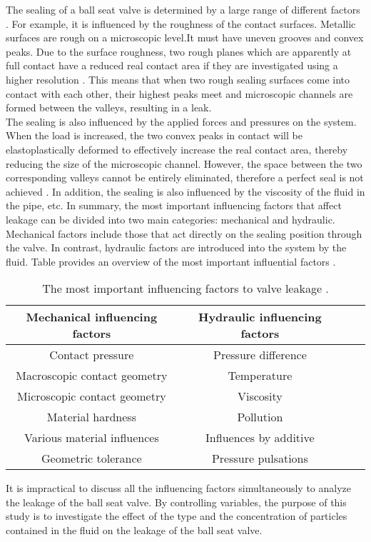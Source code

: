 The sealing of a ball seat valve is determined by a large range of different factors \cite{fischer2021influence}.
For example, it is influenced by the roughness of the contact surfaces. Metallic surfaces are rough 
on a microscopic level.It must have uneven grooves and convex peaks. Due to the surface roughness, two rough 
planes which are apparently at full contact have a reduced real contact area if they 
are investigated using a higher resolution \cite{fischer2021geometry}. This means that when two 
rough sealing surfaces come into contact with each other,
 their highest peaks meet and microscopic channels are formed between the valleys, resulting in a leak.\\

 The sealing is also influenced by the applied forces and pressures on the system. When the load is increased,
  the two convex peaks in contact will be elastoplastically deformed to effectively increase the real contact area, 
  thereby reducing the size of the microscopic channel. However, the space between 
 the two corresponding valleys cannot be entirely eliminated, therefore a perfect seal is not achieved \cite{Sealing2}.
 In addition, the sealing is also influenced by the viscosity of the fluid in the pipe, etc. 
 In summary, the most important influencing factors that affect leakage can be divided into two main 
 categories: mechanical and hydraulic. Mechanical factors include those that act directly on the sealing 
 position through the valve. In contrast, hydraulic factors are introduced into 
 the system by the fluid. Table  provides an overview of the most 
 important influential factors \cite{PhD-M.S}.


    \begin{table}[h!]
        \centering
        \begin{tabular}{|c| c |c |c|} 
         \hline
         Mechanical influencing factors & Hydraulic influencing factors  \\ [0.5ex] 
         \hline
         Contact pressure  & Pressure difference  \\ 
         Macroscopic contact geometry & Temperature  \\
         Microscopic contact geometry & Viscosity \\
         Material hardness & Pollution \\
         Various material influences & Influences by additive \\
         Geometric tolerance & Pressure pulsations\\[1ex] 
         \hline
        \end{tabular}
        \caption{The most important influencing factors to valve leakage \cite{PhD-M.S}.}
        \label{tab:influencing factors to valve}
        \end{table}

        It is impractical to discuss all the influencing factors simultaneously to analyze 
        the leakage of the ball seat valve. By controlling variables, the purpose of this study
         is to investigate the effect of the type and the 
        concentration of particles contained in the fluid on the leakage of the ball seat valve.